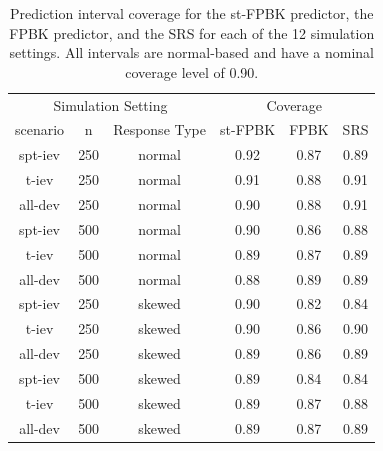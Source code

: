 \documentclass[]{interact}
\theoremstyle{plain}%
\theoremstyle{definition}
\theoremstyle{remark}
\begin{document}
\begin{table}[H]

\caption{\label{tab:simpitab}Prediction interval coverage for the st-FPBK predictor, the FPBK predictor, and the SRS for each of the 12 simulation settings. All intervals are normal-based and have a nominal coverage level of 0.90.}
\centering
\begin{tabular}[t]{cccccc}
\toprule
\multicolumn{3}{c}{Simulation Setting} & \multicolumn{3}{c}{Coverage} \\
\cmidrule(l{3pt}r{3pt}){1-3} \cmidrule(l{3pt}r{3pt}){4-6}
scenario & n & Response Type & st-FPBK & FPBK & SRS\\
\midrule
spt-iev & 250 & normal & 0.92 & 0.87 & 0.89\\
t-iev & 250 & normal & 0.91 & 0.88 & 0.91\\
all-dev & 250 & normal & 0.90 & 0.88 & 0.91\\
\midrule
spt-iev & 500 & normal & 0.90 & 0.86 & 0.88\\
t-iev & 500 & normal & 0.89 & 0.87 & 0.89\\
all-dev & 500 & normal & 0.88 & 0.89 & 0.89\\
\midrule
spt-iev & 250 & skewed & 0.90 & 0.82 & 0.84\\
t-iev & 250 & skewed & 0.90 & 0.86 & 0.90\\
all-dev & 250 & skewed & 0.89 & 0.86 & 0.89\\
\midrule
spt-iev & 500 & skewed & 0.89 & 0.84 & 0.84\\
t-iev & 500 & skewed & 0.89 & 0.87 & 0.88\\
all-dev & 500 & skewed & 0.89 & 0.87 & 0.89\\
\bottomrule
\end{tabular}
\end{table}



\end{document}
